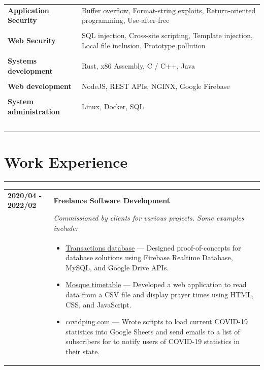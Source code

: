 \documentclass[letterpaper]{article}
\newcommand{\sect}[1]{\section*{#1}
                        {\color{cyan}
                        \rule{\textwidth}{1pt}
                        \vspace{-1ex}}}
\begin{document}
        \begin{tabular}{p{}
                        p{}}
            \textbf{Application Security} &
                Buffer overflow,
                Format-string exploits,
                Return-oriented programming,
                Use-after-free
                \\
                \\
            \textbf{Web Security} &
                SQL injection,
                Cross-site scripting,
                Template injection,
                Local file inclusion,
                Prototype pollution
                \\
                \\
            \textbf{Systems development} &
                Rust,
                x86 Assembly,
                C / C++,
                Java
                \\
                \\
            \textbf{Web development} &
                NodeJS,
                REST APIs,
                NGINX,
                Google Firebase
                \\
                \\
            \textbf{System administration} &
                Linux,
                Docker,
                SQL
                \\
                \\

                \\\\\\\\
        \end{tabular}

    \sect{Work Experience}

        \begin{tabular}{p{} p{}}
            \textbf{2020/04 - 2022/02} & \textbf{Freelance Software Development} \\
            & \emph{Commissioned by clients for various projects. Some examples include:} \\
            & \begin{itemize}
                \item \underline{Transactions database} ---
                    Designed proof-of-concepts for database solutions using Firebase Realtime Database,
                    MySQL, and Google Drive APIs.
                \item \underline{Mosque timetable} ---
                    Developed a web application to read data from a CSV file and display prayer times
                    using HTML, CSS, and JavaScript.
                \item \underline{covidping.com} ---
                    Wrote scripts to load current COVID-19 statistics into Google Sheets and send emails
                    to a list of subscribers for to notify users of COVID-19 statistics in their state.
            \end{itemize}
        \end{tabular}
\end{document}
